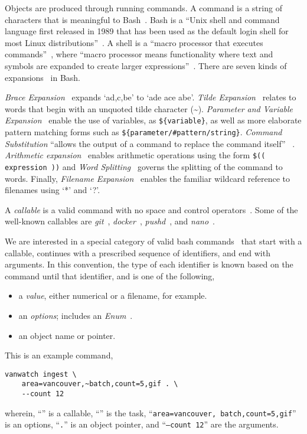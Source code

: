 Objects are produced through running commands. A command is a string of characters that is meaningful to Bash~\cite{gnu_bash}. Bash is a \enquote{Unix shell and command language first released in 1989 that has been used as the default login shell for most Linux distributions}~\cite{bash}. A shell is a \enquote{macro processor that executes commands}~\cite{bash_manual}, where \enquote{macro processor means functionality where text and symbols are expanded to create larger expressions}~\cite{bash_manual}. There are seven kinds of expansions~\cite{bash_expansions_ref} in Bash.

\emph{Brace Expansion}~\cite{brace_expansion} expands `a{d,c,b}e' to `ade ace abe'. \emph{Tilde Expansion}~\cite{tilde_expansion} relates to words that begin with an unquoted tilde character (\textasciitilde). \emph{Parameter and Variable Expansion}~\cite{shell_parameter_expansion} enable the use of variables, as \texttt{\$\{variable\}}, as well as more elaborate pattern matching forms such as \texttt{\$\{parameter/\#pattern/string\}}. \emph{Command Substitution} \enquote{allows the output of a command to replace the command itself} ~\cite{command_substitution}. \emph{Arithmetic expansion}~\cite{arithmetic_expansion} enables arithmetic operations using the form \texttt{\$(( expression ))} and \emph{Word Splitting}~\cite{word_splitting} governs the splitting of the command to words. Finally, \emph{Filename Expansion}~\cite{filename_expansion} enables the familiar wildcard reference to filenames using `*' and `?'.

A \emph{callable} is a valid command with no space and control operators~\cite{control_operators}. Some of the well-known callables are \emph{git}~\cite{git}, \emph{docker}~\cite{docker}, \emph{pushd}~\cite{pushd}, and \emph{nano}~\cite{nano}. 

We are interested in a special category of valid bash commands~\cite{shell_syntax} that start with a callable, continues with a prescribed sequence of identifiers, and end with arguments. In this convention, the type of each identifier is known based on the command until that identifier, and is one of the following,
%
\begin{itemize}
    \item a \emph{value}, either numerical or a filename, for example.
    \item an \emph{options}; includes an \emph{Enum}~\cite{python_eunum}.
    \item an object name or pointer.
\end{itemize}
%
This is an example command,
%
\begin{verbatim}
vanwatch ingest \
    area=vancouver,~batch,count=5,gif . \
    --count 12
\end{verbatim}
%
wherein, ``'' is a callable, ``'' is the task, ``\texttt{area=vancouver,~batch,count=5,gif}'' is an options, ``\texttt{.}'' is an object pointer, and ``\texttt{--count 12}'' are the arguments.

\marginpar{Options}




